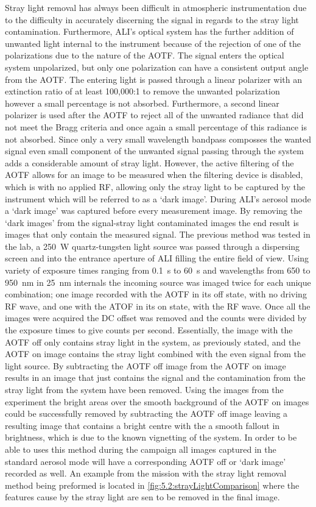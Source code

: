 Stray light removal has always been difficult in atmospheric instrumentation due to the difficulty in accurately discerning the signal in regards to the stray light contamination. Furthermore, ALI's optical system has the further addition of unwanted light internal to the instrument because of the rejection of one of the polarizations due to the nature of the AOTF. The signal enters the optical system unpolarized, but only one polarization can have a consistent output angle from the AOTF. The entering light is passed through a linear polarizer with an extinction ratio of at least 100,000:1 to remove the unwanted polarization however a small percentage is not absorbed. Furthermore, a second linear polarizer is used after the AOTF to reject all of the unwanted radiance that did not meet the Bragg criteria and once again a small percentage of this radiance is not absorbed. Since only a very small wavelength bandpass composses the wanted signal even small component of the unwanted signal passing through the system adds a considerable amount of stray light. However, the active filtering of the AOTF allows for an image to be measured when the filtering device is disabled, which is with no applied RF, allowing only the stray light to be captured by the instrument which will be referred to as a `dark image'. During ALI's aerosol mode a `dark image' was captured before every measurement image. By removing the `dark images' from the signal-stray light contaminated images the end result is images that only contain the measured signal. The previous method was tested in the lab, a 250~W quartz-tungsten light source was passed through a dispersing screen and into the entrance aperture of ALI filling the entire field of view. Using variety of exposure times ranging from 0.1~s to 60~s and wavelengths from 650 to 950~nm in 25~nm internals the incoming source was imaged twice for each unique combination; one image recorded with the AOTF in its off state, with no driving RF wave, and one with the ATOF in its on state, with the RF wave. Once all the images were acquired the DC offset was removed and the counts were divided by the exposure times to give counts per second. Essentially, the image with the AOTF off only contains stray light in the system, as previously stated, and the AOTF on image contains the stray light combined with the even signal from the light source. By subtracting the AOTF off image from the AOTF on image results in an image that just contains the signal and the contamination from the stray light from the system have been removed. Using the images from the experiment the bright areas over the smooth background of the AOTF on images could be successfully removed by subtracting the AOTF off image leaving a resulting image that contains a bright centre with the a smooth fallout in brightness, which is due to the known vignetting of the system. In order to be able to uses this method during the campaign all images captured in the standard aerosol mode will have a corresponding AOTF off or `dark image' recorded as well. An example from the mission with the stray light removal method being preformed is located in \autoref{fig:5.2:strayLightComparison} where the features cause by the stray light are sen to be removed in the final image.

